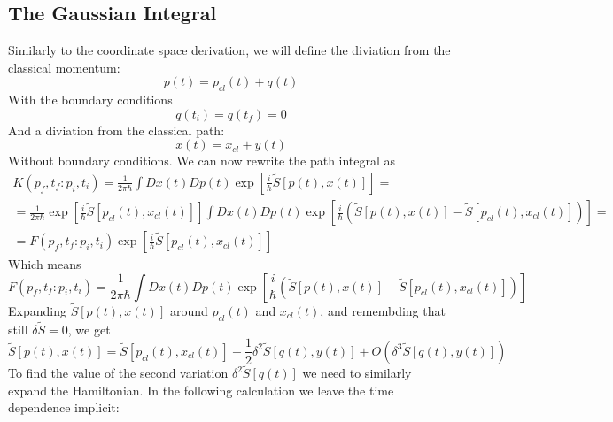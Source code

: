 \documentclass{article}
\begin{document}
\subsection{The Gaussian Integral}
Similarly to the coordinate space derivation, we will define the diviation from the classical momentum:
\begin{equation}
    p(t) = p_{cl}(t) + q(t)
\end{equation}
With the boundary conditions
\begin{equation}
    q(t_i) = q(t_f) = 0
\end{equation}
And a diviation from the classical path:
\begin{equation}
    x(t) = x_{cl} + y(t)
\end{equation}
Without boundary conditions.
We can now rewrite the path integral as
\begin{equation}
\begin{gathered}
    K(p_f, t_f : p_i, t_i) = \frac{1}{2\pi\hbar}\int Dx(t) Dp(t) \exp[\frac{i}{\hbar}\tilde{S}[p(t), x(t)]] =
    \\
    = \frac{1}{2\pi\hbar} \exp[\frac{i}{\hbar}\tilde{S}[p_{cl}(t),x_{cl}(t)]] \int Dx(t) Dp(t) \exp[\frac{i}{\hbar}\left(\tilde{S}[p(t),x(t)] - \tilde{S}[p_{cl}(t),x_{cl}(t)]\right)] =
    \\
    = F(p_f, t_f : p_i, t_i) \exp[\frac{i}{\hbar}\tilde{S}[p_{cl}(t),x_{cl}(t)]] 
\end{gathered}
\end{equation}
Which means
\begin{equation}
    F(p_f, t_f : p_i, t_i) = \frac{1}{2\pi\hbar} \int Dx(t) Dp(t) \exp[\frac{i}{\hbar}\left(\tilde{S}[p(t), x(t)] - \tilde{S}[p_{cl}(t), x_{cl}(t)]\right)]
\end{equation}
Expanding $\tilde{S}[p(t),x(t)]$ around $p_{cl}(t)$ and $x_{cl}(t)$, and remembding that still $\delta\tilde{S} = 0$, we get
\begin{equation}
\label{eq:basic_action_diviation}
    \tilde{S}[p(t), x(t)] = \tilde{S}[p_{cl}(t), x_{cl}(t)] + \frac{1}{2}\delta^2\tilde{S}[q(t), y(t)] + O(\delta^3\tilde{S}[q(t),y(t)])
\end{equation}
To find the value of the second variation $\delta^2\tilde{S}[q(t)]$ we need to similarly expand the Hamiltonian. In the following calculation we leave the time dependence implicit:
\end{document}

